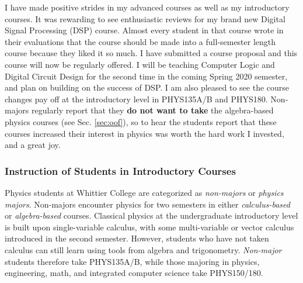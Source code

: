 \documentclass[../../main.tex]{subfiles}
\begin{document}
I have made positive strides in my advanced courses as well as my introductory courses.  It was rewarding to see enthusiastic reviews for my brand new Digital Signal Processing (DSP) course.  Almost every student in that course wrote in their evaluations that the course should be made into a full-semester length course because they liked it so much.  I have submitted a course proposal and this course will now be regularly offered.  I will be teaching Computer Logic and Digital Circuit Design for the second time in the coming Spring 2020 semester, and plan on building on the success of DSP.  I am also pleased to see the course changes pay off at the introductory level in PHYS135A/B and PHYS180.  Non-majors regularly report that they \textbf{do not want to take} the algebra-based physics courses (see Sec. \ref{sec:oof}), so to hear the students report that these courses increased their interest in physics was worth the hard work I invested, and a great joy.

\subsubsection{Instruction of Students in Introductory Courses}

\label{sec:teaching_phil1}

Physics students at Whittier College are categorized as \textit{non-majors} or \textit{physics majors}.  Non-majors encounter physics for two semesters in either \textit{calculus-based} or \textit{algebra-based} courses.  Classical physics at the undergraduate introductory level is built upon single-variable calculus, with some multi-variable or vector calculus introduced in the second semester.  However, students who have not taken calculus can still learn using tools from algebra and trigonometry.  \textit{Non-major} students therefore take PHYS135A/B, while those majoring in physics, engineering, math, and integrated computer science take PHYS150/180.  \\ \hspace{0.1cm}
\end{document}
